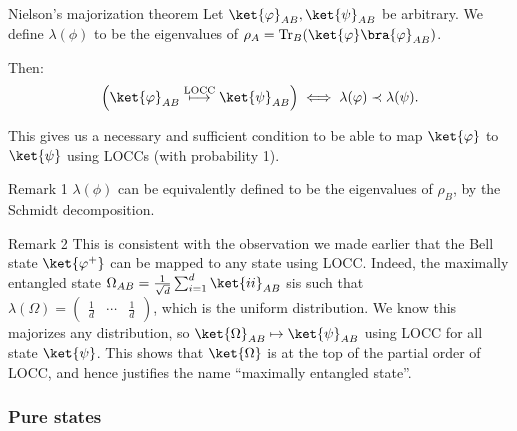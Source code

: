 \documentclass[a4paper]{article}
\begin{document}
\begin{parag}{Nielson's majorization theorem}
    Let $\ket{\phi}_{AB}, \ket{\psi}_{AB}$ be arbitrary. We define $\lambda\left(\phi\right)$ to be the eigenvalues of $\rho_A = \Tr_B\left(\ket{\phi}\bra{\phi}_{AB}\right)$. 

    Then: 
    \[\left(\ket{\phi}_{AB} \over{\longmapsto}{LOCC} \ket{\psi}_{AB}\right) \iff \lambda\left(\phi\right) \prec \lambda\left(\psi\right).\]
    
    This gives us a necessary and sufficient condition to be able to map $\ket{\phi}$ to $\ket{\psi}$ using LOCCs (with probability 1).

    \begin{subparag}{Remark 1}
        $\lambda\left(\phi\right)$ can be equivalently defined to be the eigenvalues of $\rho_B$, by the Schmidt decomposition.
    \end{subparag}

    \begin{subparag}{Remark 2}
        This is consistent with the observation we made earlier that the Bell state $\ket{\phi^+}$ can be mapped to any state using LOCC. Indeed, the maximally entangled state $\Omega_{AB} = \frac{1}{\sqrt{d}} \sum_{i=1}^{d} \ket{ii}_{AB}$ sis such that $\lambda\left(\Omega\right) = \begin{pmatrix} \frac{1}{d} & \cdots & \frac{1}{d} \end{pmatrix} $, which is the uniform distribution. We know this majorizes any distribution, so $\ket{\Omega}_{AB} \mapsto \ket{\psi}_{AB}$ using LOCC for all state $\ket{\psi}$. This shows that $\ket{\Omega}$ is at the top of the partial order of LOCC, and hence justifies the name ``maximally entangled state''.
    \end{subparag}
\end{parag}

\subsubsection{Pure states}
\end{document}
